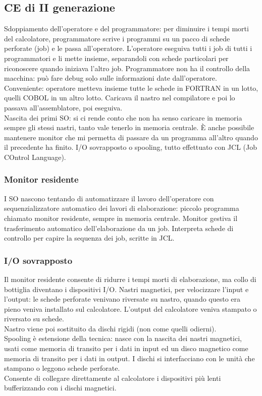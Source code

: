 \documentclass[12pt, oneside]{extbook}
\begin{document}
\subsection{CE di II generazione}
Sdoppiamento dell'operatore e del programmatore: per diminuire i tempi morti del calcolatore, programmatore scrive i programmi su un pacco di schede perforate (job) e le passa all'operatore. L'operatore eseguiva tutti i job di tutti i programmatori e li mette insieme, separandoli con schede particolari per riconoscere quando iniziava l'altro job. Programmatore non ha il controllo della macchina: può fare debug solo sulle informazioni date dall'operatore. Conveniente: operatore metteva insieme tutte le schede in FORTRAN in un lotto, quelli COBOL in un altro lotto. Caricava il nastro nel compilatore e poi lo passava all'assemblatore, poi eseguiva.\\ Nascita dei primi SO: si ci rende conto che non ha senso caricare in memoria sempre gli stessi nastri, tanto vale tenerlo in memoria centrale. È anche possibile mantenere monitor  che mi permetta di passare da un programma all'altro quando il precedente ha finito. I/O sovrapposto o spooling, tutto effettuato con JCL (Job COntrol Language).
\subsubsection{Monitor residente}
I SO nascono tentando di automatizzare il lavoro dell'operatore con sequenzializzatore automatico dei lavori di elaborazione: piccolo programma chiamato monitor residente, sempre in memoria centrale. Monitor gestiva il trasferimento automatico dell'elaborazione da un job. Interpreta schede di controllo per capire la sequenza dei job, scritte in JCL.
\subsubsection{I/O sovrapposto}
Il monitor residente consente di ridurre i tempi morti di elaborazione, ma collo di bottiglia diventano i dispositivi I/O. Nastri magnetici, per velocizzare l'input e l'output: le schede perforate venivano riversate su nastro, quando questo era pieno veniva installato sul calcolatore. L'output del calcolatore veniva stampato o riversato su schede.\\ Nastro viene poi sostituito da dischi rigidi (non come quelli odierni).\\ Spooling è estensione della tecnica: nasce con la nascita dei nastri magnetici, usati come memoria di transito per i dati in input ed un disco magnetico come memoria di transito per i dati in output. I dischi si interfacciano con le unità che stampano o leggono schede perforate.\\ Consente di collegare direttamente al calcolatore i dispositivi più lenti bufferizzando con i dischi magnetici.
\end{document}
